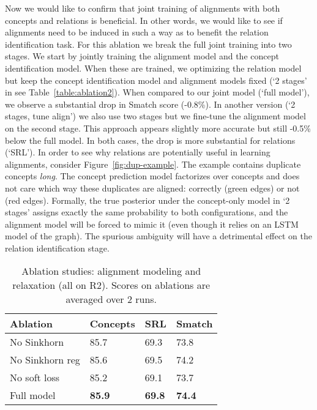 \documentclass[11pt,a4paper]{article}
\begin{document}
Now we would like to confirm  that joint training of alignments with both concepts and relations is beneficial. In other words,
we would like to see if alignments need to be induced in such a way as to benefit the relation identification task.
For this ablation
we break the full joint training into two stages.
We start by jointly training the alignment model and the concept identification model. When these are trained, we  optimizing the relation model   but keep the concept identification model and alignment models fixed (`2 stages' in see Table~\ref{table:ablation2}). When compared to our joint model (`full model'),  we observe a substantial drop in Smatch score (-0.8\%). In another version (`2 stages, tune align') we also use two stages but we fine-tune the alignment model on the second stage. This approach appears slightly more accurate but still -0.5\% below the full model.  In both cases, the drop is more substantial for relations (`SRL').
In order to see why relations are potentially useful in learning alignments, consider  Figure~\ref{fig:dup-example}. The example contains duplicate concepts \textit{long}. The concept prediction model factorizes over concepts and does not care which way these duplicates are aligned: correctly (green edges) or not (red edges). Formally, the true posterior under the concept-only model in `2 stages' assigns exactly the same probability to both configurations, and the alignment model   will be forced to mimic it (even though it relies on an LSTM model of the graph). The spurious ambiguity will have a detrimental effect on the relation identification stage.

\begin{table}[t]
    \begin{center} 
        \begin{tabular}{llll} 
            \hline  Ablation   &   Concepts &    SRL   & Smatch \\\hline
            No Sinkhorn     &85.7& 69.3&73.8\\
            No Sinkhorn reg     &85.6& 69.5&74.2\\ 
            No soft loss      & 85.2 & 69.1& 73.7\\
            Full model     &\bf85.9& \bf69.8& {\bf 74.4}\\
            \hline
        \end{tabular}
    \end{center}
    \vspace{-2ex}
	\caption{\label{table:ablation3} Ablation studies: alignment modeling and relaxation (all on R2). Scores on ablations are averaged over 2 runs. 
    }
    \vspace{-2ex}
\end{table}
\end{document}
